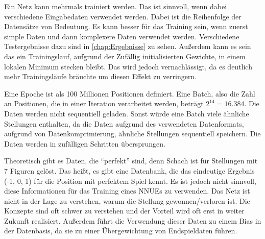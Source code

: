 Ein Netz kann mehrmals trainiert werden. Das ist sinnvoll, wenn dabei verschiedene Eingabedaten verwendet werden. Dabei ist die Reihenfolge der Datensätze von Bedeutung. Es kann besser für das Training sein, wenn zuerst simple Daten und dann komplexere Daten verwendet werden. Verschiedene Testergebnisse dazu sind in \autoref{chap:Ergebnisse} zu sehen. Außerdem kann es sein das ein Trainingslauf, aufgrund der Zufällig initialisierten Gewichte, in einem lokalen Minimum stecken bleibt. Das wird jedoch vernachlässigt, da es deutlich mehr Trainingsläufe bräuchte um diesen Effekt zu verringern.

Eine Epoche ist als 100 Millionen Positionen definiert. Eine Batch, also die Zahl an Positionen, die in einer Iteration verarbeitet werden, beträgt $2^{14}=16.384$. Die Daten werden nicht sequentiell geladen. Sonst würde eine Batch viele ähnliche Stellungen enthalten, da die Daten aufgrund des verwendeten Datenformats, aufgrund von Datenkomprimierung, ähnliche Stellungen sequentiell speichern. Die Daten werden in zufälligen Schritten übersprungen.




Theoretisch gibt es Daten, die \enquote{perfekt} sind, denn Schach ist für Stellungen mit 7 Figuren gelöst. Das heißt, es gibt eine Datenbank, die das eindeutige Ergebnis (-1, 0, 1) für die Position mit perfektem Spiel kennt. Es ist jedoch nicht sinnvoll, diese Informationen für das Training eines \acp{NNUE} zu verwenden. Das Netz ist nicht in der Lage zu verstehen, warum die Stellung gewonnen/verloren ist. Die Konzepte sind oft schwer zu verstehen und der Vorteil wird oft erst in weiter Zukunft realisiert. Außerdem führt die Verwendung dieser Daten zu einem Bias in der Datenbasis, da sie zu einer Übergewichtung von Endspieldaten führen.


